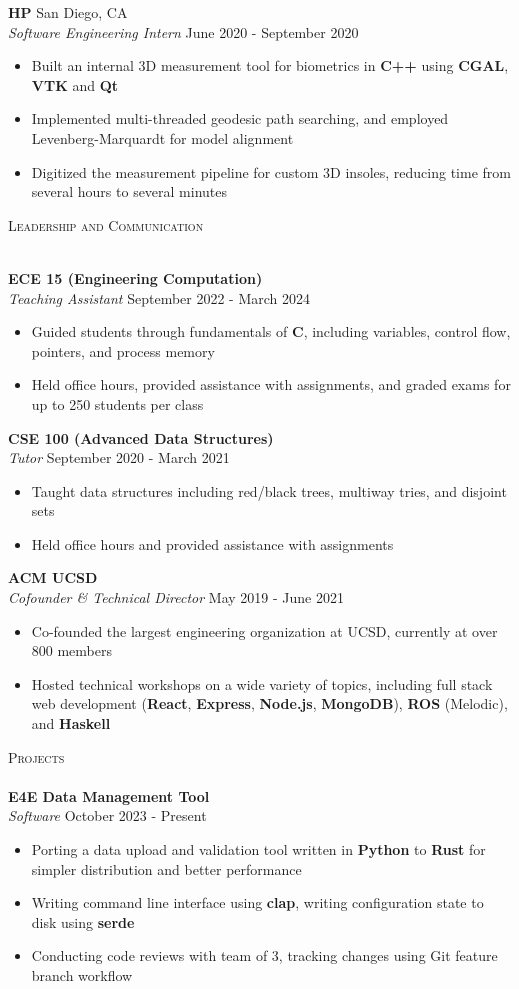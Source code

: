 \documentclass[a4paper]{article}
\newcommand{\lineunder} {
    \vspace*{-8pt} \\
    \hspace*{-18pt} \hrulefill \\
}
\newcommand{\header} [1] {
    {\hspace*{-18pt}\vspace*{6pt} \textsc{#1}}
    \vspace*{-6pt} \lineunder
}
\newenvironment{entry}[4][]{
  \textbf{#2} \hfill #1 \\
  \textit{#3} \hfill #4 \\
  \vspace{-2mm}
  \begin{itemize} \itemsep 0em
  }
  {
  \end{itemize}
}
\begin{document}
\begin{entry}[San Diego, CA]{HP}{Software Engineering Intern}{June 2020 -
    September 2020}
\item Built an internal 3D measurement tool for biometrics in \textbf{C++} using \textbf{CGAL}, \textbf{VTK} and \textbf{Qt}
\item Implemented multi-threaded geodesic path searching, and employed
  Levenberg-Marquardt for model alignment
\item Digitized the measurement pipeline for custom 3D insoles, reducing time from several hours to several minutes
\end{entry}
\pagebreak

\header{Leadership and Communication}
\vspace{1mm}

\begin{entry}{ECE 15 (Engineering Computation)}{Teaching Assistant}{September 2022 - March 2024}
  \item Guided students through fundamentals of \textbf{C},
    including variables, control flow, pointers, and process memory
  \item Held office hours, provided assistance with assignments, and graded exams for up to 250 students per class
\end{entry}

\begin{entry}{CSE 100 (Advanced Data Structures)}{Tutor}{September 2020 - March 2021}
  \item Taught data structures including red/black trees, multiway tries, and disjoint sets
  \item Held office hours and provided assistance with assignments
\end{entry}

\begin{entry}{ACM UCSD}{Cofounder \& Technical Director}{May 2019 - June 2021}
  \item Co-founded the largest engineering organization at UCSD, currently at over 800 members
  \item Hosted technical workshops on a wide variety of topics, including full
    stack web development (\textbf{React}, \textbf{Express}, \textbf{Node.js}, \textbf{MongoDB}), \textbf{ROS} (Melodic), and \textbf{Haskell}
\end{entry}

\header{Projects}
\vspace{1mm}
\begin{entry}{E4E Data Management Tool}{Software}{October 2023 - Present}
\item Porting a data upload and validation tool written in \textbf{Python} to \textbf{Rust} for simpler distribution and better performance
\item Writing command line interface using \textbf{clap}, writing configuration state to disk using \textbf{serde}
\item Conducting code reviews with team of 3, tracking changes using Git feature branch workflow
\end{entry}
\end{document}
